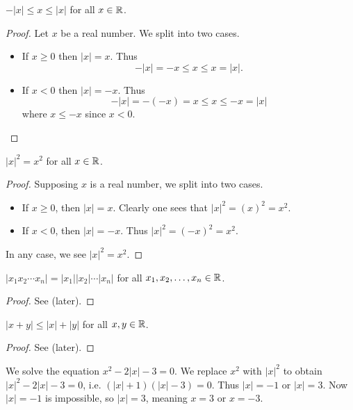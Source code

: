 \begin{proposition}
    $-|x| \leq x \leq |x|$ for all $x \in \mathbb{R}$.
\end{proposition}
\begin{proof}
    Let $x$ be a real number. We split into two cases.
    \begin{itemize}
        \item If $x \geq 0$ then $|x| = x$. Thus
        \[
            -|x| = -x \leq x \leq x = |x|.
        \]
        \item If $x < 0$ then $|x| = -x$. Thus
        \[
            -|x| = -(-x) = x \leq x \leq -x = |x|
        \]
        where $x \leq -x$ since $x < 0$.\qedhere
    \end{itemize}
\end{proof}

\begin{proposition}
    $|x|^2 = x^2$ for all $x \in \mathbb{R}$.
\end{proposition}
\begin{proof}
    Supposing $x$ is a real number, we split into two cases.
    \begin{itemize}
        \item If $x \geq 0$, then $|x| = x$. Clearly one sees that $|x|^2 = (x)^2 = x^2$.
        \item If $x < 0$, then $|x| = -x$. Thus $|x|^2 = (-x)^2 = x^2$.
    \end{itemize}
    In any case, we see $|x|^2 = x^2$.
\end{proof}

\begin{proposition}
    $|x_1x_2\cdots x_n| = |x_1||x_2|\cdots|x_n|$ for all $x_1, x_2, \dots, x_n \in \mathbb{R}$.
\end{proposition}
\begin{proof}
    See  (later).
\end{proof}

\begin{proposition}\label{prop-triangle-inequality}
    $|x + y| \leq |x| + |y|$ for all $x, y \in \mathbb{R}$.
\end{proposition}
\begin{proof}
    See  (later).
\end{proof}

\begin{example}
    We solve the equation $x^2 - 2|x| - 3 = 0$. We replace $x^2$ with $|x|^2$ to obtain $|x|^2 - 2|x| - 3 = 0$, i.e. $(|x|+1)(|x|-3) = 0$. Thus $|x| = -1$ or $|x| = 3$. Now $|x| = -1$ is impossible, so $|x| = 3$, meaning $x = 3$ or $x = -3$.
\end{example}

